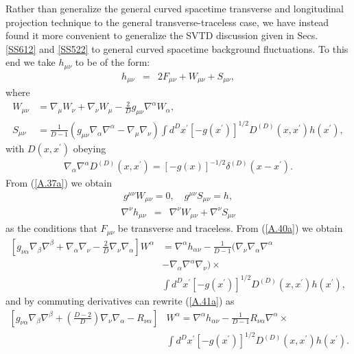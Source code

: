 Rather than generalize the general curved spacetime transverse and longitudinal projection technique to the general transverse-traceless case, we have instead  found it more convenient to generalize the SVTD discussion given in Secs. \ref{SS612} and \ref{SS522} to general curved spacetime background fluctuations. To this end we take $h_{\mu\nu}$ to be of the form:
%
\begin{eqnarray}
h_{\mu\nu} &=& 2F_{\mu\nu}+W_{\mu\nu}+S_{\mu\nu},
\label{A.36a}
\end{eqnarray}
%
where
%
\begin{align}
W_{\mu\nu} &=\nabla_\mu W_\nu + \nabla_\nu W_\mu - \frac{2}{D}g_{\mu\nu}\nabla^\alpha W_\alpha,
\nonumber\\
S_{\mu\nu}&=\frac{1}{D-1}\left( g_{\mu\nu}\nabla_\alpha \nabla^\alpha - \nabla_\mu\nabla_\nu\right)\int d^Dx^{\prime}[-g(x^{\prime})]^{1/2}D^{(D)}(x,x^{\prime}) h(x^{\prime}),
\label{A.37a}
\end{align}
%
with $D(x,x^{\prime})$ obeying
%
\begin{eqnarray}
\nabla_\alpha \nabla^\alpha D^{(D)}(x,x^{\prime}) =[-g(x)]^{-1/2}\delta^{(D)}(x-x^{\prime}).
\label{A.38a}
\end{eqnarray}
%
From (\ref{A.37a}) we obtain
%
\begin{eqnarray}
g^{\mu\nu}W_{\mu\nu}=0,\quad g^{\mu\nu}S_{\mu\nu}=h,
\label{A.39a}
\end{eqnarray}
%
%
\begin{eqnarray}
\nabla^\nu h_{\mu\nu} &=& \nabla^\nu W_{\mu\nu} + \nabla^\nu S_{\mu\nu}
\label{A.40a}
\end{eqnarray}
%
as the conditions that $F_{\mu\nu}$ be transverse and traceless. From (\ref{A.40a}) we obtain 
%
\begin{align}
\left[g_{\nu\alpha} \nabla_\beta \nabla^\beta +\nabla_\alpha \nabla_\nu - \frac{2}{D}\nabla_\nu\nabla_\alpha\right] W^\alpha
&=\nabla^\alpha h_{\alpha\nu} - \frac{1}{D-1}(\nabla_\nu \nabla_\alpha\nabla^\alpha 
\nonumber\\
&- \nabla_\alpha\nabla^\alpha \nabla_\nu)\times
\nonumber\\
&
\int d^Dx^{\prime}[-g(x^{\prime})]^{1/2} D^{(D)}(x,x^{\prime}) h(x^{\prime}),
\label{A.41a}
\end{align}
%
and by commuting derivatives can rewrite (\ref{A.41a}) as
%
\begin{align}
\left[g_{\nu\alpha}\nabla_\beta\nabla^\beta + \left(\frac{D-2}{D}\right)\nabla_\nu \nabla_\alpha - R_{\nu\alpha}\right]&W^\alpha
= \nabla^\alpha h_{\alpha\nu} - \frac{1}{D-1}R_{\nu\alpha}\nabla^\alpha \times
\nonumber\\
&\int d^Dx^{\prime}[-g(x^{\prime})]^{1/2}D^{(D)}(x,x^{\prime}) h(x^{\prime}).
\label{A.42a}
\end{align}
%

